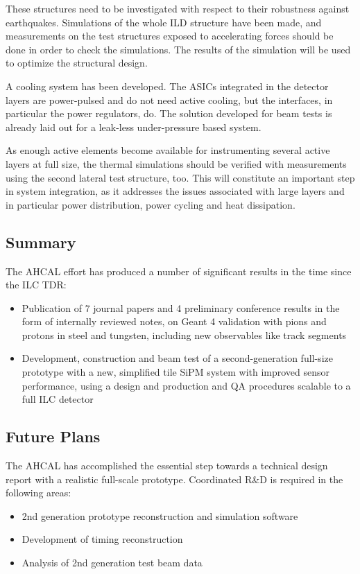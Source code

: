 These structures need to be investigated with respect to their robustness against earthquakes. Simulations of the whole ILD structure have been made, and measurements on the test structures exposed to accelerating forces should be done in order to check the simulations. The results of the simulation will be used to optimize the structural design.

A cooling system has been developed. The ASICs integrated in the detector layers are power-pulsed and do not need active cooling, but the interfaces, in particular the power regulators, do. The solution developed for beam tests is already laid out for a leak-less under-pressure based system.

As enough active elements become available for instrumenting several active layers at full size, the thermal simulations should be verified with measurements using the second lateral test structure, too. This will constitute an important step in system integration, as it addresses the issues associated with large layers and in particular power distribution, power cycling and heat dissipation.

\subsection{Summary}
The AHCAL effort has produced a number of significant results in the time since the ILC TDR:
\begin{itemize}
\item Publication of 7 journal papers and 4 preliminary conference results in the form of internally reviewed notes, on Geant 4 validation with pions and protons in steel and tungsten, including new observables like track segments
\item Development, construction and beam test of a second-generation full-size prototype with a new, simplified tile SiPM system with improved sensor performance, using a design and production and QA procedures scalable to a full ILC detector
\end{itemize}

\subsection{Future Plans}

The AHCAL has accomplished the essential step towards a technical design report with a realistic full-scale prototype. Coordinated R\&D is required in the following areas:

\begin{itemize}
\item 2nd generation prototype reconstruction and simulation software
\item Development of timing reconstruction
\item Analysis of 2nd generation test beam data
\end{itemize}


